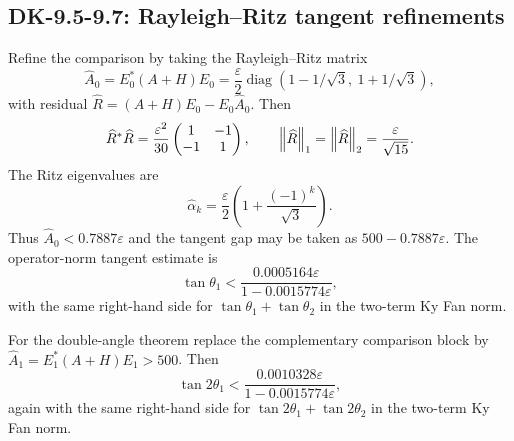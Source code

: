 \subsection*{DK-9.5-9.7: Rayleigh--Ritz tangent refinements}
Refine the comparison by taking the Rayleigh--Ritz matrix
\[
 \widehat A_0=E_0^*(A+H)E_0
 =\frac{\varepsilon}{2}\operatorname{diag}(1-1/\sqrt3,\ 1+1/\sqrt3),
\]
with residual $\widehat R=(A+H)E_0-E_0\widehat A_0$.  Then
\[
 \widehat R^*\widehat R
 =\frac{\varepsilon^2}{30}\begin{pmatrix}1&-1\\-1&1\end{pmatrix},
 \qquad
 \left\lVert \widehat R\right\rVert_1=\left\lVert \widehat R\right\rVert_2=\frac{\varepsilon}{\sqrt{15}}.
\]
The Ritz eigenvalues are
\begin{equation}
 \widehat\alpha_k
 =\frac{\varepsilon}{2}\left(1+\frac{(-1)^k}{\sqrt3}\right).
 \tag{9.5}
\end{equation}
Thus $\widehat A_0<0.7887\varepsilon$ and the tangent gap may be taken as $500-0.7887\varepsilon$.  The operator-norm tangent estimate is
\begin{equation}
 \tan\theta_1
 <\frac{0.0005164\varepsilon}{1-0.0015774\varepsilon},
 \tag{9.6}
\end{equation}
with the same right-hand side for $\tan\theta_1+\tan\theta_2$ in the two-term Ky Fan norm.

For the double-angle theorem replace the complementary comparison block by $\widehat A_1=E_1^*(A+H)E_1>500$.  Then
\begin{equation}
 \tan2\theta_1
 <\frac{0.0010328\varepsilon}{1-0.0015774\varepsilon},
 \tag{9.7}
\end{equation}
again with the same right-hand side for $\tan2\theta_1+\tan2\theta_2$ in the two-term Ky Fan norm.

